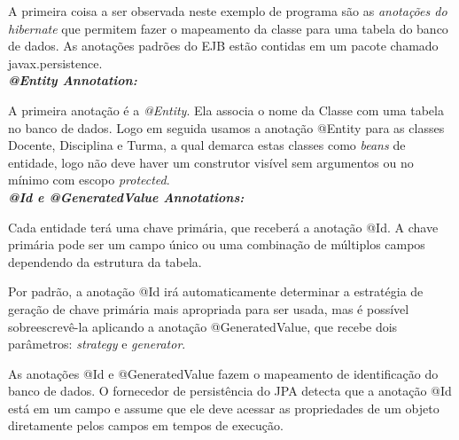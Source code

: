 \documentclass[12pt,a4paper]{article}
\begin{document}
 A primeira coisa a ser observada neste exemplo de programa são as \textit{anotações do hibernate} que permitem fazer o mapeamento da classe para uma tabela do banco de dados. As anotações padrões do EJB estão contidas em um pacote chamado javax.persistence.\\

\textit{\textbf{@Entity Annotation:}}

A primeira anotação é a \textit{@Entity}. Ela associa o nome da Classe com uma tabela no banco de dados. Logo em seguida usamos a anotação @Entity para as classes Docente, Disciplina e Turma, a qual demarca estas classes como \textit{beans} de entidade, logo não deve haver um construtor visível sem argumentos ou no mínimo com escopo \textit{protected}. \\

\textit{\textbf{@Id e @GeneratedValue Annotations:}}

Cada entidade terá uma chave primária, que receberá a anotação @Id. A chave primária pode ser um campo único ou uma combinação de múltiplos campos dependendo da estrutura da tabela.



Por padrão, a anotação @Id irá automaticamente determinar a estratégia de geração de chave primária mais apropriada para ser usada, mas é possível sobreescrevê-la aplicando a anotação @GeneratedValue, que recebe dois parâmetros: \textit{strategy} e \textit{generator}.


As anotações @Id e @GeneratedValue fazem o mapeamento de identificação do banco de dados. O fornecedor de persistência do JPA detecta que a anotação @Id está em um campo e assume que ele deve acessar as propriedades de um objeto diretamente pelos campos em tempos de execução.\\
\end{document}
